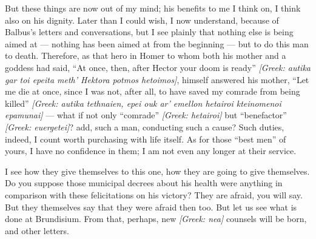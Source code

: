  But these things are now out of my mind; his benefits to me I think on, I think also on his dignity. Later than I could wish, I now understand, because of Balbus's letters and conversations, but I see plainly that nothing else is being aimed at --- nothing has been aimed at from the beginning --- but to do this man to death. Therefore, as that hero in Homer to whom both his mother and a goddess had said, ``At once, then, after Hector your doom is ready'' \textit{[Greek: autika gar toi epeita meth' Hektora potmos hetoimos]}, himself answered his mother, ``Let me die at once, since I was not, after all, to have saved my comrade from being killed'' \textit{[Greek: autika tethnaien, epei ouk ar' emellon hetairoi kteinomenoi epamunai]} --- what if not only ``comrade'' \textit{[Greek: hetairoi]} but ``benefactor'' \textit{[Greek: euergetei]}? add, such a man, conducting such a cause? Such duties, indeed, I count worth purchasing with life itself. As for those ``best men'' of yours, I have no confidence in them; I am not even any longer at their service.

 I see how they give themselves to this one, how they are going to give themselves. Do you suppose those municipal decrees about his health were anything in comparison with these felicitations on his victory? They are afraid, you will say. But they themselves say that they were afraid then too. But let us see what is done at Brundisium. From that, perhaps, new \textit{[Greek: nea]} counsels will be born, and other letters.
